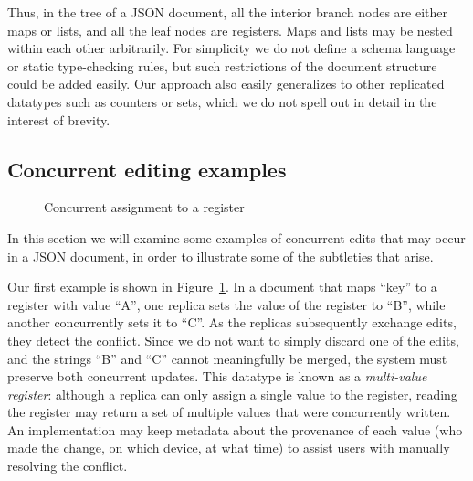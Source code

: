\documentclass[10pt,journal,compsoc]{IEEEtran}
\begin{document}
Thus, in the tree of a JSON document, all the interior branch nodes are either maps or lists, and all the leaf nodes are registers. Maps and lists may be nested within each other arbitrarily. For simplicity we do not define a schema language or static type-checking rules, but such restrictions of the document structure could be added easily. Our approach also easily generalizes to other replicated datatypes such as counters or sets, which we do not spell out in detail in the interest of brevity.

\subsection{Concurrent editing examples}

\begin{figure}
\centering
{}
\caption{Concurrent assignment to a register}\label{fig:register-assign}
\end{figure}

In this section we will examine some examples of concurrent edits that may occur in a JSON document, in order to illustrate some of the subtleties that arise.

Our first example is shown in Figure~\ref{fig:register-assign}. In a document that maps ``key'' to a register with value ``A'', one replica sets the value of the register to ``B'', while another concurrently sets it to ``C''. As the replicas subsequently exchange edits, they detect the conflict. Since we do not want to simply discard one of the edits, and the strings ``B'' and ``C'' cannot meaningfully be merged, the system must preserve both concurrent updates. This datatype is known as a \emph{multi-value register}: although a replica can only assign a single value to the register, reading the register may return a set of multiple values that were concurrently written. An implementation may keep metadata about the provenance of each value (who made the change, on which device, at what time) to assist users with manually resolving the conflict.
\end{document}
